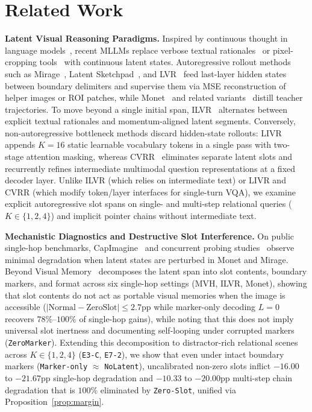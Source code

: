 \section{Related Work}
\label{sec:related}

\textbf{Latent Visual Reasoning Paradigms.} Inspired by continuous thought in language models~\cite{hao2025coconut,shen2025codi,goyal2024pause}, recent MLLMs replace verbose textual rationales~\cite{shao2024visualcot} or pixel-cropping tools~\cite{su2025pixelreasoner,zheng2026deepeyes} with continuous latent states. Autoregressive rollout methods such as Mirage~\cite{yang2026mirage}, Latent Sketchpad~\cite{zhang2025sketchpad}, and LVR~\cite{li2026lvr} feed last-layer hidden states between boundary delimiters and supervise them via MSE reconstruction of helper images or ROI patches, while Monet~\cite{wang2026monet} and related variants~\cite{tong2025skila,wang2026laser,jiang2026univlr,cheng2026hylar,adhikari2026pearl} distill teacher trajectories. To move beyond a single initial span, ILVR~\cite{dong2026ilvr} alternates between explicit textual rationales and momentum-aligned latent segments. Conversely, non-autoregressive bottleneck methods discard hidden-state rollouts: LIVR~\cite{li2026livr} appends $K=16$ static learnable vocabulary tokens in a single pass with two-stage attention masking, whereas CVRR~\cite{park2026cvrr} eliminates separate latent slots and recurrently refines intermediate multimodal question representations at a fixed decoder layer. Unlike ILVR (which relies on intermediate text) or LIVR and CVRR (which modify token/layer interfaces for single-turn VQA), we examine explicit autoregressive slot spans on single- and multi-step relational queries ($K \in \{1, 2, 4\}$) and implicit pointer chains without intermediate text.

\textbf{Mechanistic Diagnostics and Destructive Slot Interference.} On public single-hop benchmarks, CapImagine~\cite{li2026capimagine} and concurrent probing studies~\cite{viveiros2026holding,zhang2026cosine,zhang2026unsilencing} observe minimal degradation when latent states are perturbed in Monet and Mirage. Beyond Visual Memory~\cite{guo2026beyond} decomposes the latent span into slot contents, boundary markers, and format across six single-hop settings (MVH, ILVR, Monet), showing that slot contents do not act as portable visual memories when the image is accessible ($|\text{Normal} - \text{ZeroSlot}| \le 2.7$pp while marker-only decoding $L=0$ recovers $78\%$--$100\%$ of single-hop gains), while noting that this does not imply universal slot inertness and documenting self-looping under corrupted markers (\texttt{ZeroMarker}). Extending this decomposition to distractor-rich relational scenes across $K \in \{1, 2, 4\}$ (\texttt{E3-C}, \texttt{E7-2}), we show that even under intact boundary markers (\texttt{Marker-only} $\approx$ \texttt{NoLatent}), uncalibrated non-zero slots inflict $-16.00$ to $-21.67$pp single-hop degradation and $-10.33$ to $-20.00$pp multi-step chain degradation that is $100\%$ eliminated by \texttt{Zero-Slot}, unified via Proposition~\ref{prop:margin}.

